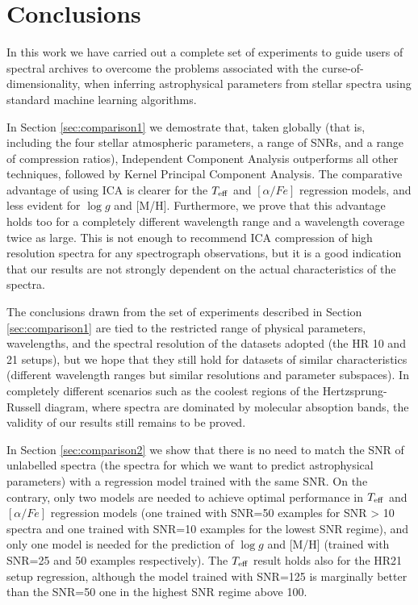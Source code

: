\documentclass[a4paper,fleqn,usenatbib]{mnras}
\begin{document}
{\section{Conclusions}
\label{sec:conclusions}

In this work we have carried out a complete set of experiments to 
guide users of spectral archives to overcome the problems associated 
with the curse-of-dimensionality, when inferring 
astrophysical parameters from stellar spectra using standard machine 
learning algorithms. 

In Section \ref{sec:comparison1} we demostrate that, taken globally 
(that is, including the four stellar atmospheric parameters, a 
range of SNRs, and a range of compression ratios),
Independent Component Analysis outperforms all other techniques, followed  
by Kernel Principal Component Analysis. The comparative advantage of 
using ICA is clearer for the $T_{\rm eff}$ and $\left[ \alpha/Fe \right]$ 
regression models, and less evident for $\log g$ and [M/H]. Furthermore, 
we prove that this advantage holds too for a completely different wavelength range 
and a wavelength coverage twice as large. This is not enough to recommend 
ICA compression of high resolution spectra for any spectrograph observations, but it 
is a good indication that our results are not strongly dependent on the 
actual characteristics of the spectra. 

The conclusions drawn from the set of experiments described in Section \ref{sec:comparison1}
are tied to the restricted range of physical parameters, wavelengths,
and the spectral resolution of the datasets adopted (the HR 10 and 21 setups), but we hope that they
still hold for datasets of similar characteristics (different
wavelength ranges but similar resolutions and parameter subspaces). In
completely different scenarios such as the coolest regions of the
Hertzsprung-Russell diagram, where spectra are dominated by molecular
absoption bands, the validity of our results still remains to be proved.

In Section \ref{sec:comparison2} we show that there is no need to match 
the SNR of unlabelled spectra (the spectra for which we want to predict 
astrophysical parameters) with a regression model trained with the same SNR. 
On the contrary, only two models are needed to achieve optimal performance 
in $T_{\rm eff}$ and $\left[ \alpha/Fe \right]$ regression models (one trained 
with SNR=50 examples for SNR > 10 spectra and one trained with SNR=10 examples 
for the lowest SNR regime), and only one model is needed for the prediction 
of $\log g$ and [M/H] (trained with SNR=25 and 50 examples respectively). 
The $T_{\rm eff}$ result holds also for the HR21 setup regression, although the  
model trained with SNR=125 is marginally better than the SNR=50 one in the highest 
SNR regime above 100.

}
\end{document}
